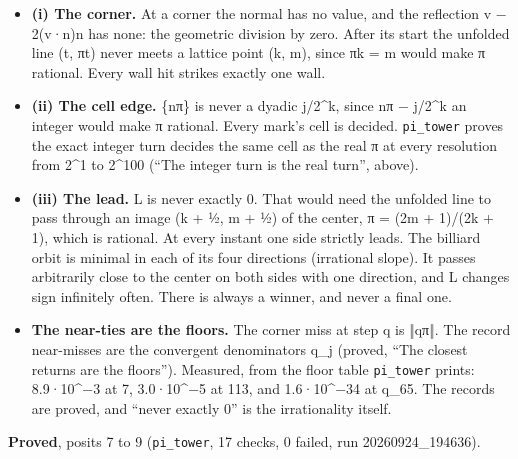 \begin{itemize}
\begin{itemize}
\item \textbf{(i) The corner.} At a corner the normal has no value, and the reflection v − 2(v·n)n has none: the geometric division by zero. After its start the unfolded line (t, πt) never meets a lattice point (k, m), since πk = m would make π rational. Every wall hit strikes exactly one wall.
\item \textbf{(ii) The cell edge.} \{nπ\} is never a dyadic j/2\textasciicircum{}k, since nπ − j/2\textasciicircum{}k an integer would make π rational. Every mark's cell is decided. \texttt{pi\_\allowbreak{}tower} proves the exact integer turn decides the same cell as the real π at every resolution from 2\textasciicircum{}1 to 2\textasciicircum{}100 (“The integer turn is the real turn”, above).
\item \textbf{(iii) The lead.} L is never exactly 0. That would need the unfolded line to pass through an image (k + ½, m + ½) of the center, π = (2m + 1)/(2k + 1), which is rational. At every instant one side strictly leads. The billiard orbit is minimal in each of its four directions (irrational slope). It passes arbitrarily close to the center on both sides with one direction, and L changes sign infinitely often. There is always a winner, and never a final one.
\item \textbf{The near-ties are the floors.} The corner miss at step q is ‖qπ‖. The record near-misses are the convergent denominators q\_\allowbreak{}j (proved, “The closest returns are the floors”). Measured, from the floor table \texttt{pi\_\allowbreak{}tower} prints: 8.9·10\textasciicircum{}−3 at 7, 3.0·10\textasciicircum{}−5 at 113, and 1.6·10\textasciicircum{}−34 at q\_\allowbreak{}65. The records are proved, and “never exactly 0” is the irrationality itself.
\end{itemize}
\end{itemize}

\textbf{Proved}, posits 7 to 9 (\texttt{pi\_\allowbreak{}tower}, 17 checks, 0 failed, run 20260924\_\allowbreak{}194636).

